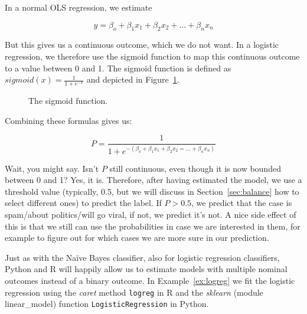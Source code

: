 In a normal OLS regression, we estimate

$$y = \beta_o + \beta_1 x_1 + \beta_2 x_2 + \ldots + \beta_n x_n$$

But this gives us a continuous outcome, which we do not want. In a
logistic regression, we therefore use the sigmoid function to map this
continuous outcome to a value between 0 and 1. The sigmoid function is
defined as $sigmoid(x) = \frac{1}{1 + e^{-x}}$ and depicted in
Figure~\ref{fig:sigmoid}.

\begin{figure}
  \centering
{}
\caption{\label{fig:sigmoid} The sigmoid function.}
\end{figure}


Combining these formulas gives us:

$$P = \frac{1}{1 + e^{-(\beta_o + \beta_1 x_1 + \beta_2 x_2 = \ldots + \beta_n x_n)}} $$


Wait, you might say. Isn't $P$ still continuous, even though it is now
bounded between 0 and 1? Yes, it is.  Therefore, after having
estimated the model, we use a threshold value (typically, 0.5, but we will discuss in Section~\ref{sec:balance} how to select different ones) to
predict the label. If $P>0.5$, we predict that the case is spam/about
politics/will go viral, if not, we predict it's not.
A nice side effect of this is that we still can use the probabilities
in case we are interested in them, for example to figure out for which
cases we are more sure in our prediction.

Just as with the Na\"ive Bayes classifier, also for logistic
regression classifiers, Python and R will happily allow us to estimate
models with multiple nominal outcomes instead of a binary outcome. In Example~\ref{ex:logreg} we fit the logistic regression using the \emph{caret} method \texttt{logreg} in R and the \emph{sklearn} (module linear\_model) function \texttt{LogisticRegression} in Python.

